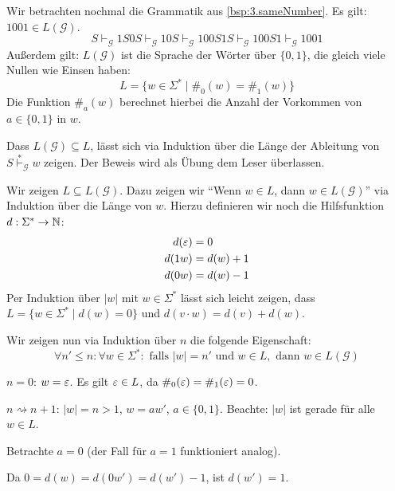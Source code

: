 \begin{Bsp}Wir betrachten nochmal die Grammatik aus \autoref{bsp:3.sameNumber}.
Es gilt: $1001\in L(\mathcal{G})$.
$$ S 
\vdash_\mathcal{G} 1S0S
\vdash_\mathcal{G} 10S
\vdash_\mathcal{G} 100S1S
\vdash_\mathcal{G} 100S1
\vdash_\mathcal{G} 1001
$$
Außerdem gilt: $L(\mathcal{G})$ ist die Sprache der Wörter über $\{0,1\}$, die gleich viele Nullen wie Einsen haben:
  \begin{displaymath}
    L = \{ w \in \Sigma^* \mid \#_0(w) = \#_1(w)\}
  \end{displaymath}
  Die Funktion $\#_a(w)$ berechnet hierbei die Anzahl der Vorkommen von $a \in \{0, 1\}$ in $w$.

  Dass $L(\mathcal{G}) \subseteq L$, lässt sich via Induktion über die Länge der Ableitung von $S \stackrel{*}{\vdash}_\mathcal{G} w$ zeigen.
  Der Beweis wird als Übung dem Leser überlassen.

  Wir zeigen $L \subseteq L(\mathcal{G})$.
  Dazu zeigen wir "`Wenn $w \in L$, dann $w \in L(\mathcal{G})$"' via Induktion über die Länge von $w$.
  Hierzu definieren wir noch die Hilfsfunktion $d : \Sigma^* \to \mathbb{N}$:
  \begin{align*}
    d(\varepsilon) &= 0 \\
    d(1w) &= d(w) + 1 \\
    d(0w) &= d(w) - 1
  \end{align*}
  Per Induktion über $|w|$ mit $w \in \Sigma^*$ lässt sich leicht zeigen, dass $L = \{w \in \Sigma^* \mid d(w) = 0\}$ und $d(v \cdot w) = d(v) + d(w)$.
  
Wir zeigen nun via Induktion über $n$ die folgende Eigenschaft:
$$\forall n' \leq n: \forall w \in \Sigma^*: \text{ falls } |w| = n' \text{ und } w \in L, \text{ dann } w \in L(\mathcal{G})$$

\begin{description}[font=\normalfont]
\item[I.A.:] $n = 0$: $w = \varepsilon$. Es gilt $\varepsilon \in L$, da $\#_0(\varepsilon) = \#_1(\varepsilon) = 0$.
\item[I.S.:] $n \rightsquigarrow n+1$: $|w| = n > 1$, $w = aw'$, $a \in \{0,1\}$.
  Beachte: $|w|$ ist gerade für alle $w \in L$.

  Betrachte $a = 0$ (der Fall für $a = 1$ funktioniert analog).

  Da $0 = d(w) = d(0w') = d(w') - 1$, ist $d(w') = 1$.
  

\end{description}
\end{Bsp}
